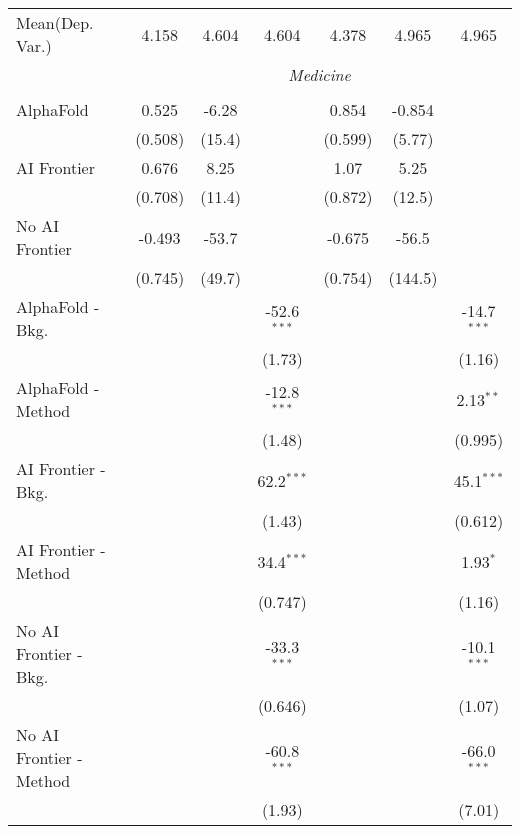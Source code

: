 \begin{tabular}{lcccccc}
Mean(Dep. Var.) & 4.158 & 4.604 & 4.604 & 4.378 & 4.965 & 4.965 \\
 & \multicolumn{6}{c}{\textit{Medicine}} \\ \\
   AlphaFold               & 0.525   & -6.28  &               & 0.854   & -0.854  &   \\   
                           & (0.508) & (15.4) &               & (0.599) & (5.77)  &   \\   
   AI Frontier             & 0.676   & 8.25   &               & 1.07    & 5.25    &   \\   
                           & (0.708) & (11.4) &               & (0.872) & (12.5)  &   \\   
   No AI Frontier          & -0.493  & -53.7  &               & -0.675  & -56.5   &   \\   
                           & (0.745) & (49.7) &               & (0.754) & (144.5) &   \\   
   AlphaFold - Bkg.        &         &        & -52.6$^{***}$ &         &         & -14.7$^{***}$\\   
                           &         &        & (1.73)        &         &         & (1.16)\\   
   AlphaFold - Method      &         &        & -12.8$^{***}$ &         &         & 2.13$^{**}$\\   
                           &         &        & (1.48)        &         &         & (0.995)\\   
   AI Frontier - Bkg.      &         &        & 62.2$^{***}$  &         &         & 45.1$^{***}$\\   
                           &         &        & (1.43)        &         &         & (0.612)\\   
   AI Frontier - Method    &         &        & 34.4$^{***}$  &         &         & 1.93$^{*}$\\   
                           &         &        & (0.747)       &         &         & (1.16)\\   
   No AI Frontier - Bkg.   &         &        & -33.3$^{***}$ &         &         & -10.1$^{***}$\\   
                           &         &        & (0.646)       &         &         & (1.07)\\   
   No AI Frontier - Method &         &        & -60.8$^{***}$ &         &         & -66.0$^{***}$\\   
                           &         &        & (1.93)        &         &         & (7.01)\\   

\end{tabular}
